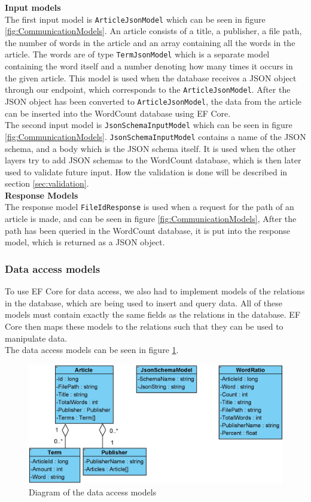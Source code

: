 \textbf{Input models}\\
The first input model is \texttt{ArticleJsonModel} which can be seen in figure \ref{fig:CommunicationModels}. An article consists of a title, a publisher, a file path, the number of words in the article and an array containing all the words in the article. 
The words are of type \texttt{TermJsonModel} which is a separate model containing the word itself and a number denoting how many times it occurs in the given article.
This model is used when the database receives a JSON object through our endpoint, which corresponds to the \texttt{ArticleJsonModel}. 
After the JSON object has been converted to \texttt{ArticleJsonModel}, the data from the article can be inserted into the WordCount database using EF Core.
\\
The second input model is \texttt{JsonSchemaInputModel} which can be seen in figure \ref*{fig:CommunicationModels}. \texttt{JsonSchemaInputModel} contains a name of the JSON schema, and a body which is the JSON schema itself. 
It is used when the other layers try to add JSON schemas to the WordCount database, which is then later used to validate future input. 
How the validation is done will be described in section \ref*{sec:validation}.
\\
\textbf{Response Models}\\
The response model \texttt{FileIdResponse} is used when a request for the path of an article is made, and can be seen in figure \ref*{fig:CommunicationModels},
After the path has been queried in the WordCount database, it is put into the response model, which is returned as a JSON object.

\subsubsection*{Data access models}
To use EF Core for data access, we also had to implement models of the relations in the database, which are being used to insert and query data. 
All of these models must contain exactly the same fields as the relations in the database.
EF Core then maps these models to the relations such that they can be used to manipulate data.
\\
The data access models can be seen in figure \ref*{fig:DataAccesModels}. 
\begin{figure}[H]
    \centering
    \includegraphics[scale=0.4]{Images/DataAccessModels.jpg}
    \caption{Diagram of the data access models}
    \label{fig:DataAccesModels}
\end{figure}